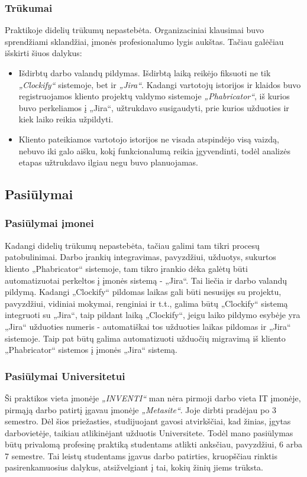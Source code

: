 \subsubsection{Trūkumai}
Praktikoje didelių trūkumų nepastebėta. Organizaciniai klausimai buvo sprendžiami sklandžiai, įmonės profesionalumo lygis aukštas. Tačiau galėčiau išskirti šiuos dalykus:
\medskip

\begin{itemize}
    \item Išdirbtų darbo valandų pildymas. Išdirbtą laiką reikėjo fiksuoti ne tik \textit{„Clockify“} sistemoje, bet ir \textit{„Jira“}. Kadangi vartotojų istorijos ir klaidos buvo registruojamos
    kliento projektų valdymo sistemoje \textit{„Phabricator“}, iš kurios buvo perkeliamos į „Jira“, užtrukdavo susigaudyti, prie kurios užduoties ir kiek laiko reikia užpildyti.
    \item Kliento pateikiamos vartotojo istorijos ne visada atspindėjo visą vaizdą, nebuvo iki galo aišku, kokį funkcionalumą reikia įgyvendinti, todėl analizės etapas užtrukdavo ilgiau
    negu buvo planuojamas.
\end{itemize}


\subsection{Pasiūlymai}

\subsubsection{Pasiūlymai įmonei}
Kadangi didelių trūkumų nepastebėta, tačiau galimi tam tikri procesų patobulinimai. Darbo įrankių integravimas, pavyzdžiui, užduotys, sukurtos kliento „Phabricator“ sistemoje,
tam tikro įrankio dėka galėtų būti automatizuotai perkeltos į įmonės sistemą - „Jira“. Tai liečia ir darbo valandų pildymą. Kadangi „Clockify“ pildomas laikas
gali būti nesusijęs su projektu, pavyzdžiui, vidiniai mokymai, renginiai ir t.t., galima būtų „Clockify“ sistemą integruoti su „Jira“, taip pildant laiką „Clockify“,
jeigu laiko pildymo esybėje yra „Jira“ užduoties numeris - automatiškai tos užduoties laikas pildomas ir „Jira“ sistemoje.
Taip pat būtų galima automatizuoti užduočių migravimą iš kliento „Phabricator“ sistemos į įmonės „Jira“ sistemą.

\subsubsection{Pasiūlymai Universitetui}
Ši praktikos vieta įmonėje \textit{„INVENTI“} man nėra pirmoji darbo vieta IT įmonėje, pirmąją darbo patirtį įgavau įmonėje \textit{„Metasite“}. Joje dirbti pradėjau
po 3 semestro. Dėl šios priežasties, studijuojant gavosi atvirkščiai, kad žinias, įgytas darbovietėje, taikiau atlikinėjant užduotis Universitete.
Todėl mano pasiūlymas būtų privalomą profesinę praktiką studentams atlikti anksčiau, pavyzdžiui, 6 arba 7 semestre. Tai leistų studentams įgavus darbo patirties,
kruopščiau rinktis pasirenkamuosius dalykus, atsižvelgiant į tai, kokių žinių jiems trūksta.

